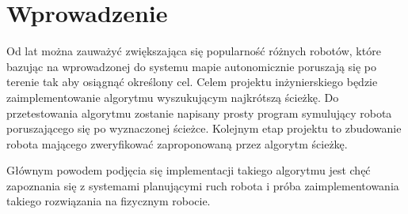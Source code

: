 \section{Wprowadzenie}
Od lat można zauważyć zwiększająca się popularność różnych robotów, które bazując na wprowadzonej do systemu mapie
autonomicznie poruszają się po terenie tak aby osiągnąć określony cel.
Celem projektu inżynierskiego będzie zaimplementowanie algorytmu wyszukującym najkrótszą ścieżkę.
Do przetestowania algorytmu zostanie napisany prosty program symulujący robota poruszającego się po wyznaczonej ścieżce.
Kolejnym etap projektu to zbudowanie robota mającego zweryfikować zaproponowaną przez algorytm ścieżkę. 

Głównym powodem podjęcia się implementacji takiego algorytmu jest chęć zapoznania się z systemami planującymi ruch robota
i próba zaimplementowania takiego rozwiązania na fizycznym robocie.


